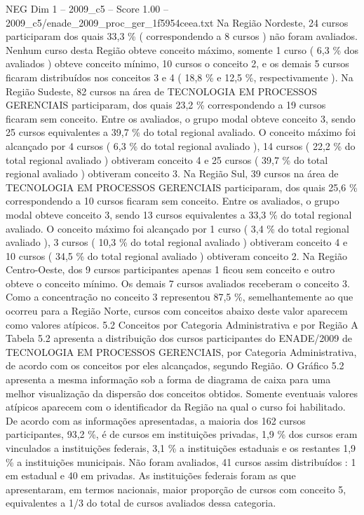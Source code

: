 \begin{textsample}{NEG Dim 1 – 2009\_c5 – Score 1.00 – 2009\_c5/enade\_2009\_proc\_ger\_1f5954ceea.txt}
Na Região Nordeste, 24 cursos participaram dos quais 33,3 \% ( correspondendo a 8 cursos ) não foram avaliados.
Nenhum curso desta Região obteve conceito máximo, somente 1 curso ( 6,3 \% dos avaliados ) obteve conceito mínimo, 10 cursos o conceito 2, e os demais 5 cursos ficaram distribuídos nos conceitos 3 e 4 ( 18,8 \% e 12,5 \%, respectivamente ).
Na Região Sudeste, 82 cursos na área de TECNOLOGIA EM PROCESSOS GERENCIAIS participaram, dos quais 23,2 \% correspondendo a 19 cursos ficaram sem conceito.
Entre os avaliados, o grupo modal obteve conceito 3, sendo 25 cursos equivalentes a 39,7 \% do total regional avaliado.
O conceito máximo foi alcançado por 4 cursos ( 6,3 \% do total regional avaliado ), 14 cursos ( 22,2 \% do total regional avaliado ) obtiveram conceito 4 e 25 cursos ( 39,7 \% do total regional avaliado ) obtiveram conceito 3.
Na Região Sul, 39 cursos na área de TECNOLOGIA EM PROCESSOS GERENCIAIS participaram, dos quais 25,6 \% correspondendo a 10 cursos ficaram sem conceito.
Entre os avaliados, o grupo modal obteve conceito 3, sendo 13 cursos equivalentes a 33,3 \% do total regional avaliado.
O conceito máximo foi alcançado por 1 curso ( 3,4 \% do total regional avaliado ), 3 cursos ( 10,3 \% do total regional avaliado ) obtiveram conceito 4 e 10 cursos ( 34,5 \% do total regional avaliado ) obtiveram conceito 2.
Na Região Centro-Oeste, dos 9 cursos participantes apenas 1 ficou sem conceito e outro obteve o conceito mínimo.
Os demais 7 cursos avaliados receberam o conceito 3.
Como a concentração no conceito 3 representou 87,5 \%, semelhantemente ao que ocorreu para a Região Norte, cursos com conceitos abaixo deste valor aparecem como valores atípicos. 5.2 Conceitos por Categoria Administrativa e por Região A Tabela 5.2 apresenta a distribuição dos cursos participantes do ENADE/2009 de TECNOLOGIA EM PROCESSOS GERENCIAIS, por Categoria Administrativa, de acordo com os conceitos por eles alcançados, segundo Região.
O Gráfico 5.2 apresenta a mesma informação sob a forma de diagrama de caixa para uma melhor visualização da dispersão dos conceitos obtidos.
Somente eventuais valores atípicos aparecem com o identificador da Região na qual o curso foi habilitado.
De acordo com as informações apresentadas, a maioria dos 162 cursos participantes, 93,2 \%, é de cursos em instituições privadas, 1,9 \% dos cursos eram vinculados a instituições federais, 3,1 \% a instituições estaduais e os restantes 1,9 \% a instituições municipais.
Não foram avaliados, 41 cursos assim distribuídos : 1 em estadual e 40 em privadas.
As instituições federais foram as que apresentaram, em termos nacionais, maior proporção de cursos com conceito 5, equivalentes a 1/3 do total de cursos avaliados dessa categoria.

\end{textsample}
